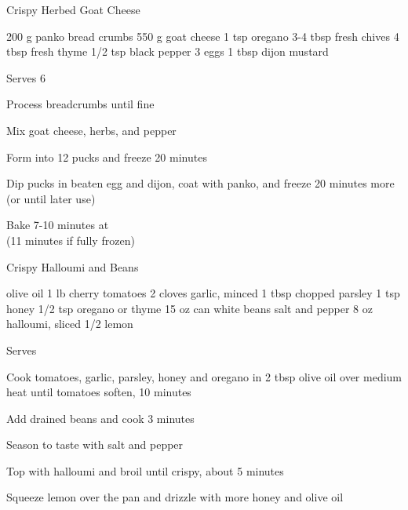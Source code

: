 \begin{recipe}{Crispy Herbed Goat Cheese}{}
\begin{ingredients}
200 g panko bread crumbs
550 g goat cheese
1 tsp oregano
3-4 tbsp fresh chives
4 tbsp fresh thyme
1/2 tsp black pepper
3 eggs
1 tbsp dijon mustard
\end{ingredients}
\nextcolumn
Serves 6
\begin{steps}
\item Process breadcrumbs until fine
\item Mix goat cheese, herbs, and pepper
\item Form into 12 pucks and freeze 20 minutes
\item Dip pucks in beaten egg and dijon, coat with panko, and freeze 20 minutes more \\(or until later use)
\item Bake 7-10 minutes at  \\(11 minutes if fully frozen)
\end{steps}
\end{recipe}

\begin{recipe}{Crispy Halloumi and Beans}{}
\begin{ingredients}
olive oil
1 lb cherry tomatoes
2 cloves garlic, minced
1 tbsp chopped parsley
1 tsp honey
1/2 tsp oregano or thyme
15 oz can white beans
salt and pepper
8 oz halloumi, sliced
1/2 lemon
\end{ingredients}
\nextcolumn
Serves
\begin{steps}
    \item Cook tomatoes, garlic, parsley, honey and oregano in 2 tbsp olive oil over medium heat until tomatoes soften, 10 minutes
    \item Add drained beans and cook 3 minutes
    \item Season to taste with salt and pepper
    \item Top with halloumi and broil until crispy, about 5 minutes
    \item Squeeze lemon over the pan and drizzle with more honey and olive oil
\end{steps}
\end{recipe}
